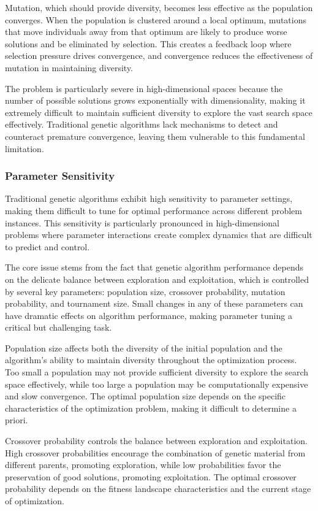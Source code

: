 \documentclass[12pt,a4paper]{article}
\begin{document}
Mutation, which should provide diversity, becomes less effective as the population converges. When the population is clustered around a local optimum, mutations that move individuals away from that optimum are likely to produce worse solutions and be eliminated by selection. This creates a feedback loop where selection pressure drives convergence, and convergence reduces the effectiveness of mutation in maintaining diversity.

The problem is particularly severe in high-dimensional spaces because the number of possible solutions grows exponentially with dimensionality, making it extremely difficult to maintain sufficient diversity to explore the vast search space effectively. Traditional genetic algorithms lack mechanisms to detect and counteract premature convergence, leaving them vulnerable to this fundamental limitation.

\subsubsection{Parameter Sensitivity}

Traditional genetic algorithms exhibit high sensitivity to parameter settings, making them difficult to tune for optimal performance across different problem instances. This sensitivity is particularly pronounced in high-dimensional problems where parameter interactions create complex dynamics that are difficult to predict and control.

The core issue stems from the fact that genetic algorithm performance depends on the delicate balance between exploration and exploitation, which is controlled by several key parameters: population size, crossover probability, mutation probability, and tournament size. Small changes in any of these parameters can have dramatic effects on algorithm performance, making parameter tuning a critical but challenging task.

Population size affects both the diversity of the initial population and the algorithm's ability to maintain diversity throughout the optimization process. Too small a population may not provide sufficient diversity to explore the search space effectively, while too large a population may be computationally expensive and slow convergence. The optimal population size depends on the specific characteristics of the optimization problem, making it difficult to determine a priori.

Crossover probability controls the balance between exploration and exploitation. High crossover probabilities encourage the combination of genetic material from different parents, promoting exploration, while low probabilities favor the preservation of good solutions, promoting exploitation. The optimal crossover probability depends on the fitness landscape characteristics and the current stage of optimization.
\end{document}
